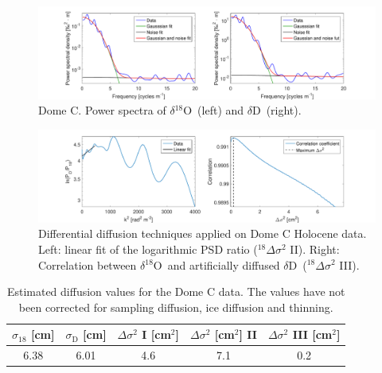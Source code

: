 \documentclass[11pt, draftcls, onecolumn]{IEEEtran} %
\numberwithin{equation}{section}
\numberwithin{table}{section}
\numberwithin{figure}{section}
\newcommand{\delOx}{$\delta{}^{18}\mathrm{O}$}
\newcommand{\delD}{$\delta\mathrm{D}$}
\begin{document}
\begin{appendices}
\begin{figure}[H]
	\vspace*{2mm}
	\centering
	\includegraphics[width=1\textwidth]{Figure_31}
	\caption{Dome C. Power spectra of \delOx~(left) and \delD~(right).}  \label{fig:DomeC_fig_1}
\end{figure}

\begin{figure}[H]
	\vspace*{2mm}
	\begin{center}
		\includegraphics[width=1\textwidth]{Figure_32}
		\caption{Differential diffusion techniques applied on Dome C Holocene data. 
			Left: linear fit of the logarithmic PSD ratio ($^{18}\Delta\sigma^2$ II). Right: 
			Correlation between \delOx~and artificially diffused \delD~($^{18}\Delta\sigma^2$ III).}  \label{fig:DomeC_fig_2}
	\end{center}
\end{figure}

\begin{table}[H]
	\center
	\caption{Estimated diffusion values for the Dome C data.
		The values have not been corrected for sampling diffusion, ice diffusion and thinning.}
	\label{DomeC}
	\begin{tabular}{c c c c c} 
		\toprule
		$\sigma_{18}$ [cm] & $\sigma_\mathrm{D}$ [cm] & $\Delta\sigma^2$ I [cm$^2$] & $\Delta\sigma^2$ [cm$^2$] II & $\Delta\sigma^2$ III [cm$^2$] \\
		\midrule
		  6.38 &   6.01 &     4.6 &     7.1 &     0.2 \\
		\bottomrule		
	\end{tabular}
\end{table}


\end{appendices}
\end{document}
